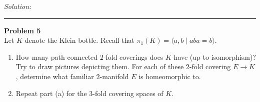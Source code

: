 \documentclass[a4paper, 12pt]{article}
\newenvironment{problem}[2][Problem]
    { \begin{mdframed}[backgroundcolor=gray!20] \textbf{#1 #2} \\}
    {  \end{mdframed}}
\newenvironment{solution}
    {\textit{Solution:}}
    {}
\newcommand{\la}{\langle}
\newcommand{\ra}{\rangle}
\begin{document}
\begin{solution}
\begin{enumerate}[(a)]
\end{enumerate}
\end{solution}

\noindent\rule{7in}{2.8pt}
\begin{problem}{5}
Let \(K\) denote the Klein bottle. Recall that \(\pi_1(K)=\la a,b\mid aba=b\ra\).
\begin{enumerate}[(1)]
\item How many path-connected \(2\)-fold coverings does \(K\) have (up to isomorphism)? Try to draw pictures depicting them. For each of these \(2\)-fold covering \(E\rightarrow K\), determine what familiar \(2\)-manifold \(E\) is homeomorphic to. 
\item Repeat part (a) for the \(3\)-fold covering spaces of \(K\). 
\end{enumerate}
\end{problem}
\end{document}
